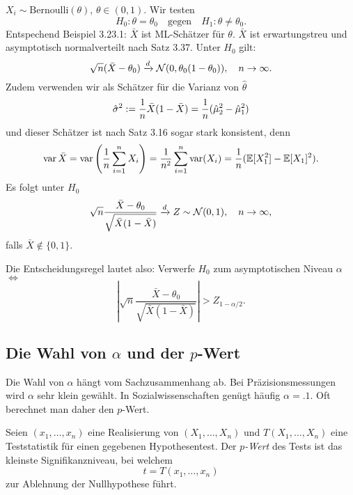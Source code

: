 \begin{exmp}[Binomialverteilung]
  $X_i \sim \mathrm{Bernoulli}( \theta )$, $\theta \in (0,1)$. Wir testen
  \[ H_0 : \theta = \theta_0 \quad \text{gegen} \quad
    H_1 : \theta \ne \theta_0. \]
  Entspechend Beispiel 3.23.1: $\bar{X}$ ist ML-Schätzer für $\theta$. $\bar{X}$
  ist erwartungstreu und asymptotisch normalverteilt nach Satz 3.37. Unter $H_0$
  gilt:
  \[ \sqrt{n} (\bar{X}-\theta_0) \xrightarrow{d} \mathcal{N}(0,
    \theta_0(1-\theta_0)), \quad n \to \infty. \]
  Zudem verwenden wir als Schätzer für die Varianz von $\hat{\theta}$
  \[ \hat{\sigma}^2 := \frac{1}{n} \bar{X} (1-\bar{X})
    = \frac{1}{n} (\hat{\mu}_2^2 - \hat{\mu}_1^2) \]
  und dieser Schätzer ist nach Satz 3.16 sogar stark konsistent, denn
  \[ \operatorname{var} \bar{X} = \operatorname{var} \left( \frac{1}{n} \sum_{i=1}^n X_i \right)
    = \frac{1}{n^2} \sum_{i=1}^n \operatorname{var}(X_i)
    = \frac{1}{n} (\mathbb{E}[X_1^2] - \mathbb{E}[X_1]^2). \]
  Es folgt unter $H_0$
  \[ \sqrt{n} \frac{\bar{X}-\theta_0}{\sqrt{\bar{X}(1-\bar{X})}}
    \xrightarrow{d} Z \sim \mathcal{N}(0,1), \quad n \to \infty, \]
  falls $\bar{X} \notin \{0,1\}$.

  Die Entscheidungsregel lautet also: Verwerfe $H_0$ zum asymptotischen Niveau
  $\alpha$ $\Leftrightarrow$
  \[ \left| \sqrt{n} \frac{\bar{X}-\theta_0}{\sqrt{\bar{X}(1-\bar{X})}} \right|
  > Z_{1-\alpha/2}. \]
\end{exmp}

\subsection{Die Wahl von $\alpha$ und der $p$-Wert}
Die Wahl von $\alpha$ hängt vom Sachzusammenhang ab. Bei Präzisionsmessungen
wird $\alpha$ sehr klein gewählt. In Sozialwissenschaften genügt häufig
$\alpha = \num{.1}$. Oft berechnet man daher den $p$-Wert.

\begin{defn}
  Seien $(x_1, \ldots, x_n)$ eine Realisierung von $(X_1, \ldots, X_n)$ und
  $T(X_1, \ldots, X_n)$ eine Teststatistik für einen gegebenen Hypothesentest.
  Der \emph{$p$-Wert} des Tests ist das kleinste Signifikanzniveau, bei welchem
  \[ t = T(x_1, \ldots, x_n) \]
  zur Ablehnung der Nullhypothese führt.
\end{defn}

